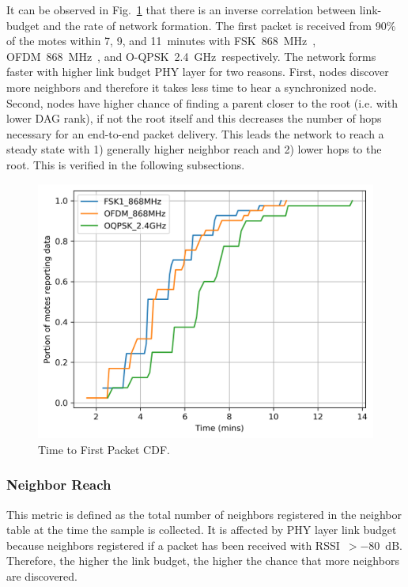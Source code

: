 \documentclass[sensors,article,submit,moreauthors,pdftex]{Definitions/mdpi}
\newcommand{\fsk}          {FSK~868~MHz}
\newcommand{\oqpsk}        {O-QPSK~2.4~GHz}
\newcommand{\ofdm}         {OFDM~868~MHz}
\begin{document}

It can be observed in Fig.~\ref{fig:time_firstpacket_cdf} that there is an inverse correlation between link-budget and the rate of network formation. 
The first packet is received from  90\% of the motes within 7, 9, and 11~minutes with \fsk\ , \ofdm\ , and \oqpsk\ respectively. 
The network forms faster with higher link budget PHY layer for two reasons. 
First, nodes discover more neighbors and therefore  it takes less time to hear a synchronized node. 
Second, nodes have higher chance of finding a parent closer to the root (i.e. with lower DAG rank), if not the root itself and this decreases the number of hops necessary for an end-to-end packet delivery.
This leads the network to reach a steady state with 1) generally higher neighbor reach and 2) lower hops to the root. 
This is verified in the following subsections.

\begin{figure}
	\centering
	\includegraphics[width=0.45\columnwidth]{time_firstpacket_cdf}
	\caption{Time to First Packet CDF.}
    \label{fig:time_firstpacket_cdf}
\end{figure}


\subsubsection{Neighbor Reach}
\label{sec:neighbor_reach}


This metric is defined as the total number of neighbors registered in the neighbor table at the time the sample is collected.
It is affected by PHY layer link budget because neighbors registered if a packet has been received with RSSI~$> -80$~dB. 
Therefore, the higher the link budget, the higher the chance that more neighbors are discovered. 

\end{document}
